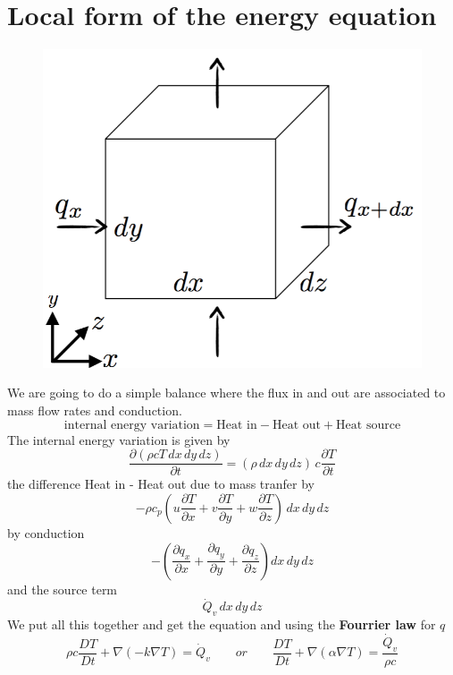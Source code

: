 \section{Local form of the energy equation}
	\begin{figure}
	\vspace{-5 mm}
	\includegraphics[scale=0.25]{ch5/5}
	\end{figure}			
	We are going to do a simple balance where the flux in and out are associated to mass flow rates and conduction. 
	\begin{equation}
		\mbox{internal energy variation} = \mbox{Heat in}-\mbox{Heat out}+\mbox{Heat source}
	\end{equation}
	The internal energy variation is given by
	\begin{equation}
		\frac{\partial (\rho cT\, dx\, dy\, dz)}{\partial t} = (\rho\, dx\, dy\, dz)\, c\frac{\partial T}{\partial t}
	\end{equation}
	the difference Heat in - Heat out due to mass tranfer by 
	\begin{equation}
		- \rho c_p (u\frac{\partial T}{\partial x} +v\frac{\partial T}{\partial y} + w\frac{\partial T}{\partial z})\, dx\, dy\, dz
	\end{equation}
	by conduction
	\begin{equation}
		- \left( \frac{\partial q_x}{\partial x} + \frac{\partial q_y}{\partial y} + \frac{\partial q_z}{\partial z} \right) dx\, dy \, dz
	\end{equation}
	and the source term 
	\begin{equation}
		\dot{Q}_v \, dx \, dy \, dz
	\end{equation}
	We put all this together and get the equation and using the \textbf{Fourrier law} for $q$
	\begin{equation}
	 \rho c\frac{DT}{Dt} + \nabla (-k\nabla T) = \dot{Q}_v \qquad or \qquad \frac{DT}{Dt} + \nabla (\alpha \nabla T) = \frac{\dot{Q}_v}{\rho c}
	 \label{eq:5.27}
	\end{equation}
	
